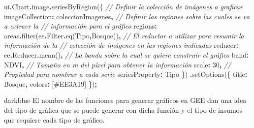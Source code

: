 \documentclass[
  12pt,
  letterpaper,
  twoside]{book}
\newenvironment{Shaded}{\begin{snugshade}}{\end{snugshade}}
\newcommand{\AttributeTok}[1]{\textcolor[rgb]{0.77,0.63,0.00}{#1}}
\newcommand{\CommentTok}[1]{\textcolor[rgb]{0.56,0.35,0.01}{\textit{#1}}}
\newcommand{\DataTypeTok}[1]{\textcolor[rgb]{0.13,0.29,0.53}{#1}}
\newcommand{\DecValTok}[1]{\textcolor[rgb]{0.00,0.00,0.81}{#1}}
\newcommand{\FunctionTok}[1]{\textcolor[rgb]{0.00,0.00,0.00}{#1}}
\newcommand{\NormalTok}[1]{#1}
\newcommand{\OperatorTok}[1]{\textcolor[rgb]{0.81,0.36,0.00}{\textbf{#1}}}
\newcommand{\StringTok}[1]{\textcolor[rgb]{0.31,0.60,0.02}{#1}}
\begin{document}
\begin{Shaded}
\begin{Highlighting}[]
\NormalTok{ui}\OperatorTok{.}\AttributeTok{Chart}\OperatorTok{.}\AttributeTok{image}\OperatorTok{.}\FunctionTok{seriesByRegion}\NormalTok{(\{}
  \CommentTok{// Definir la colección de imágenes a graficar}
  \DataTypeTok{imageCollection}\OperatorTok{:}\NormalTok{ coleccionImagenes}\OperatorTok{,} 
  \CommentTok{// Definir las regiones sobre las cuales se va a extraer la}
  \CommentTok{// información para el gráfico}
  \DataTypeTok{regions}\OperatorTok{:}\NormalTok{ areas}\OperatorTok{.}\FunctionTok{filter}\NormalTok{(ee}\OperatorTok{.}\AttributeTok{Filter}\OperatorTok{.}\FunctionTok{eq}\NormalTok{(}\StringTok{\textquotesingle{}Tipo\textquotesingle{}}\OperatorTok{,}\StringTok{\textquotesingle{}Bosque\textquotesingle{}}\NormalTok{))}\OperatorTok{,}
  \CommentTok{// El reductor a utilizar para resumir la información de la}
  \CommentTok{// colección de imágenes en las regiones indicadas}
  \DataTypeTok{reducer}\OperatorTok{:}\NormalTok{ ee}\OperatorTok{.}\AttributeTok{Reducer}\OperatorTok{.}\FunctionTok{mean}\NormalTok{()}\OperatorTok{,} 
  \CommentTok{// La banda sobre la cual se quiere construir el gráfico}
  \DataTypeTok{band}\OperatorTok{:} \StringTok{\textquotesingle{}NDVI\textquotesingle{}}\OperatorTok{,} 
  \CommentTok{// Tamaño en m del píxel para obtener la información}
  \DataTypeTok{scale}\OperatorTok{:} \DecValTok{30}\OperatorTok{,} 
  \CommentTok{// Propiedad para nombrar a cada serie}
  \DataTypeTok{seriesProperty}\OperatorTok{:} \StringTok{\textquotesingle{}Tipo\textquotesingle{}}
\NormalTok{\})}
  \OperatorTok{.}\FunctionTok{setOptions}\NormalTok{(\{}
    \DataTypeTok{title}\OperatorTok{:} \StringTok{\textquotesingle{}Bosque\textquotesingle{}}\OperatorTok{,}
    \DataTypeTok{colors}\OperatorTok{:}\NormalTok{ [}\StringTok{\textquotesingle{}\#EE3A19\textquotesingle{}}\NormalTok{]}
\NormalTok{  \})}\OperatorTok{;}
\end{Highlighting}
\end{Shaded}

\begin{bluebox2}

\begin{awesomeblock}{5pt}{\faLightbulb}{darkblue}
El nombre de las funciones para generar gráficos en GEE dan una idea del tipo de gráfica que se puede generar con dicha función y el tipo de insumos que requiere cada tipo de gráfico.

\end{awesomeblock}

\end{bluebox2}
\end{document}
